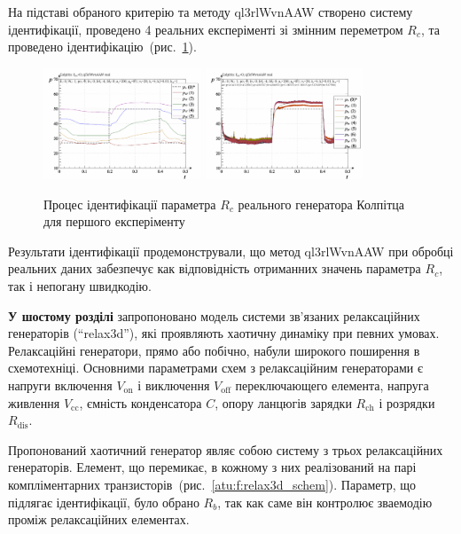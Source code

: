 \documentclass[a4paper,13pt]{atuaref}
\newcommand{\Tidx}[1]{%
  _\mathrm{#1}
}
\begin{document}
На підставі обраного критерію та методу ql3rlWvnAAW створено систему ідентифікації,
проведено 4 реальних експеріменті зі змінним переметром $R_c$,
та проведено ідентифікацію~(рис.~\ref{atu:f:colp_r_id_1}).

\begin{figure}[htb!]
  \centerline{
    \includegraphics[width=0.42\textwidth]{p6/p/r/colp_real_id-p_t_pi_ql3rlWvnAAW_real_d_0.png}
    \hfill
    \includegraphics[width=0.42\textwidth]{p6/p/r/colp_real_id-p_t_p_ql3rlWvnAAW_real_d_0.png}
  }
  \caption{Процес ідентифікації параметра $R_c$ реального генератора Колпітца для першого експеріменту}
  \label{atu:f:colp_r_id_1}
\end{figure}

Результати ідентифікації продемонстрували, що метод ql3rlWvnAAW
при обробці реальних даних забезпечує как відповідність отриманних значень параметра $R_c$,
так і непогану швидкодію.



\textbf{У шостому розділі}
запропоновано модель
системи зв'язаних релаксаційних генераторів (``relax3d''),
які проявляють хаотичну динаміку при певних умовах.
Релаксаційні генератори, прямо або побічно, набули широкого поширення в схемотехніці.
Основними параметрами схем з релаксаційним генераторами є напруги включення
$ V\Tidx{on} $ і виключення $ V \Tidx{off} $ переключающего елемента,
напруга живлення $ V\Tidx{cc} $, ємність конденсатора $C$, опору ланцюгів
зарядки $ R\Tidx{ch} $ і розрядки $ R\Tidx {dis} $.

Пропонований хаотичний генератор являє собою систему з трьох релаксаційних
генераторів. Елемент, що перемикає, в кожному з них реалізований на парі
компліментарних транзисторів~(рис.~\ref{atu:f:relax3d_schem}).
Параметр, що підлягає ідентифікації, було обрано $R_b$,
так как саме він контролює зваемодію проміж релаксаційних елементах.
\end{document}
